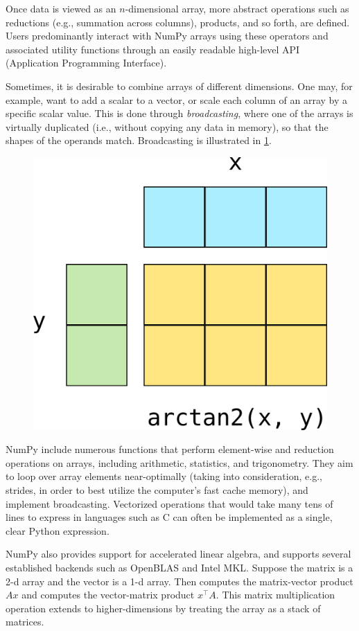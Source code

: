 Once data is viewed as an $n$-dimensional array, more abstract operations such as reductions (e.g., summation across columns), products, and so forth, are defined. Users predominantly interact with NumPy arrays using these operators and associated utility functions through an easily readable high-level API (Application Programming Interface).

Sometimes, it is desirable to combine arrays of different dimensions.  One may, for example, want to add a scalar to a vector, or scale each column of an array by a specific scalar value.  This is done through {\em broadcasting}, where one of the arrays is virtually duplicated (i.e., without copying any data in memory), so that the shapes of the operands match.  Broadcasting is illustrated in \ref{fig:broadcasting}.

\begin{figure}
  \centering
  \includegraphics[width=0.5\linewidth]{static/broadcasting}
  \caption{
   }
  \label{fig:broadcasting}
\end{figure}

NumPy include numerous functions that perform element-wise and reduction operations on arrays, including arithmetic, statistics, and trigonometry.  They aim to loop over array elements near-optimally (taking into consideration, e.g., strides, in order to best utilize the computer's fast cache memory), and implement broadcasting.  Vectorized operations that would take many tens of lines to express in languages such as C can often be implemented as a single, clear Python expression.

NumPy also provides support for accelerated linear algebra, and supports several established backends such as OpenBLAS and Intel MKL.  Suppose the matrix  is a 2-d array and the vector  is a 1-d array.  Then  computes the matrix-vector product $Ax$ and
 computes the vector-matrix product $x^\top A$.
This matrix multiplication operation extends to higher-dimensions by
treating the array as a stack of matrices.

